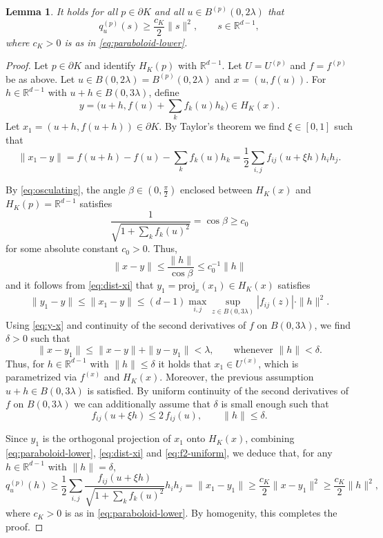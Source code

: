\documentclass[a4paper,12pt,reqno]{amsart}
\newtheorem{lem}[thm]{Lemma}
\theoremstyle{definition}
\newcommand{\IR}{\mathbb{R}}
\newcommand{\proj}{\mathrm{proj}}
\begin{document}
\begin{lem}\label{lem:pd-uniform}
It holds for all $p\in \partial K$ and all $u\in B^{(p)}(0,2\lambda)$ that
\[
	q_{u}^{(p)}(s)
	\ge \frac{c_K}{2}\|s\|^2,\qquad s\in \IR^{d-1},
\]
where $c_K>0$ is as in \eqref{eq:paraboloid-lower}.
\end{lem}
\begin{proof}
Let $p\in \partial K$ and	identify $H_K(p)$ with $\IR^{d-1}$. Let $U=U^{(p)}$ and $f=f^{(p)}$ be as above. Let $u\in B(0,2\lambda)=B^{(p)}(0,2\lambda)$ and $x=(u,f(u))$.  For $h\in \IR^{d-1}$ with $u+h\in B(0,3\lambda)$, define
\[
y=\Big(u+h,f(u)+\sum_{k}f_k(u)h_k \Big)\in H_K(x).
\]
Let $x_1=(u+h,f(u+h))\in \partial K$. By Taylor's theorem we find $\xi\in [0,1]$ such that
\begin{equation} \label{eq:dist-xi}
\|x_1-y\|
=f(u+h)-f(u)-\sum_{k}f_k(u)h_k 
=\frac{1}{2}\sum_{i,j}f_{ij}(u+\xi h)h_ih_j.
\end{equation}

By \eqref{eq:osculating}, the angle $\beta\in (0,\frac{\pi}{2})$ enclosed between $H_K(x)$ and $H_K(p)=\IR^{d-1}$ satisfies 
\begin{equation} \label{eq:cos-lower}
\frac{1}{\sqrt{1+\sum_{k}f_k(u)^2}}
=\cos\beta
\ge c_0
\end{equation}
for some absolute constant $c_0>0$. Thus,
\begin{equation} \label{eq:y-x}
\|x-y\|
\le \frac{\|h\|}{\cos \beta}
\le c_0^{-1}\|h\|
\end{equation}
and it follows from \eqref{eq:dist-xi} that $y_1=\proj_x(x_1)\in H_K(x)$ satisfies
\begin{align*}
\|y_1-y\|
\le \|x_1-y\|
\le (d-1)\max_{i,j}\sup_{z\in B(0,3\lambda)} |f_{ij}(z)|\cdot \|h\|^2.
\end{align*}
Using \eqref{eq:y-x} and continuity of the second derivatives of $f$ on $B(0,3\lambda)$, we find $\delta>0$ such that
\[
\|x-y_1\|
\le \|x-y\|+\|y-y_1\|
< \lambda,\qquad \text{whenever }\|h\|<\delta. 
\]
Thus, for $h\in \IR^{d-1}$ with $\|h\|\le \delta$ it holds that $x_1\in U^{(x)}$, which is parametrized via $f^{(x)}$ and $H_K(x)$. Moreover, the previous assumption $u+h\in B(0,3\lambda)$ is satisfied. By uniform continuity of the second derivatives of $f$ on $B(0,3\lambda)$ we can additionally assume that $\delta$ is small enough such that 
\begin{equation} \label{eq:f2-uniform}
f_{ij}(u+\xi h)\le 2\,f_{ij}(u),\qquad \|h\|\le \delta.
\end{equation}

Since $y_1$ is the orthogonal projection of $x_1$ onto $H_K(x)$, combining \eqref{eq:paraboloid-lower}, \eqref{eq:dist-xi} and \eqref{eq:f2-uniform}, we deduce that, for any $h\in \IR^{d-1}$ with $\|h\|=\delta$,
\[
q^{(p)}_u(h)
\ge \frac{1}{2}\sum_{i,j}\frac{f_{ij}(u+\xi h)}{\sqrt{1+\sum_k f_k(u)^2}}h_i h_j
= \|x_1-y_1\|
\ge \frac{c_K}{2} \|x-y_1\|^2 
\ge \frac{c_K}{2} \|h\|^2,
\]
where $c_K>0$ is as in \eqref{eq:paraboloid-lower}. By homogenity, this completes the proof.
\end{proof}
\end{document}
